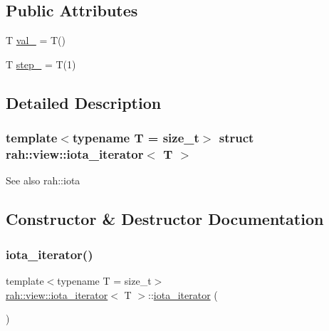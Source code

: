 \subsection*{Public Attributes}
\begin{DoxyCompactItemize}
\item 
T \mbox{\hyperlink{structrah_1_1view_1_1iota__iterator_a7a2ef77dc1a09b2eea42804c2297d057}{val\+\_\+}} = T()
\item 
T \mbox{\hyperlink{structrah_1_1view_1_1iota__iterator_ac30abc689d8d82810bf78ceec3893bd2}{step\+\_\+}} = T(1)
\end{DoxyCompactItemize}


\subsection{Detailed Description}
\subsubsection*{template$<$typename T = size\+\_\+t$>$\newline
struct rah\+::view\+::iota\+\_\+iterator$<$ T $>$}

\begin{DoxySeeAlso}{See also}
rah\+::iota 
\end{DoxySeeAlso}


\subsection{Constructor \& Destructor Documentation}
\mbox{\label{structrah_1_1view_1_1iota__iterator_ac6bb0b67f8d778854c3cb25aec3e9160}} 
\subsubsection{\texorpdfstring{iota\_iterator()}{iota\_iterator()}\hspace{0.1cm}{\footnotesize\ttfamily [1/2]}}
{\footnotesize\ttfamily template$<$typename T  = size\+\_\+t$>$ \\
\mbox{\hyperlink{structrah_1_1view_1_1iota__iterator}{rah\+::view\+::iota\+\_\+iterator}}$<$ T $>$\+::\mbox{\hyperlink{structrah_1_1view_1_1iota__iterator}{iota\+\_\+iterator}} (\begin{DoxyParamCaption}{ }\end{DoxyParamCaption})\hspace{0.3cm}{\ttfamily [default]}}

